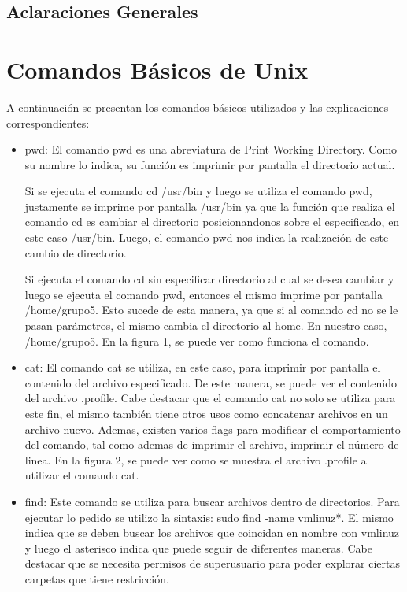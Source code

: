 \documentclass[a4paper, 12pt]{article}
\begin{document}
\tableofcontents
\newpage
\begin{center}
\section*{Aclaraciones Generales}
\end{center}

\section*{Comandos B\'asicos de Unix}

A continuaci\'on se presentan los comandos b\'asicos utilizados y las explicaciones correspondientes:
\begin{itemize}
\item pwd: El comando pwd es una abreviatura de Print Working Directory. Como su nombre lo indica, su funci\'on es imprimir por pantalla el directorio actual.

Si se ejecuta el comando cd /usr/bin y luego se utiliza el comando pwd, justamente se imprime por pantalla /usr/bin ya que la funci\'on que realiza el comando cd es cambiar el directorio posicionandonos sobre el especificado, en este caso /usr/bin. Luego, el comando pwd nos indica la realizaci\'on de este cambio de directorio.

Si ejecuta el comando cd sin especificar directorio al cual se desea cambiar y luego se ejecuta el comando pwd, entonces el mismo imprime por pantalla /home/grupo5. Esto sucede de esta manera, ya que si al comando cd no se le pasan par\'ametros, el mismo cambia el directorio al home. En nuestro caso, /home/grupo5. En la figura 1, se puede ver como funciona el comando.

\item cat: El comando cat se utiliza, en este caso, para imprimir por pantalla el contenido del archivo especificado. De este manera, se puede ver el contenido del archivo .profile. Cabe destacar que el comando cat no solo se utiliza para este fin, el mismo tambi\'en tiene otros usos como concatenar archivos en un archivo nuevo. Ademas, existen varios flags para modificar el comportamiento del comando, tal como ademas de imprimir el archivo, imprimir el n\'umero de linea. En la figura 2, se puede ver como se muestra el archivo .profile al utilizar el comando cat.

\item find: Este comando se utiliza para buscar archivos dentro de directorios. Para ejecutar lo pedido se utilizo la sintaxis: sudo find -name vmlinuz*. El mismo indica que se deben buscar los archivos que coincidan en nombre con vmlinuz y luego el asterisco indica que puede seguir de diferentes maneras. Cabe destacar que se necesita permisos de superusuario para poder explorar ciertas carpetas que tiene restricci\'on.


\end{itemize}
\end{document}
